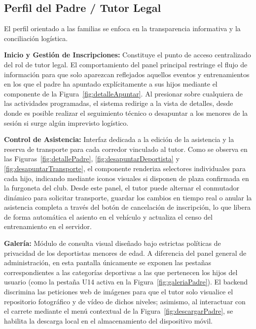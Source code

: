 \subsection{Perfil del Padre / Tutor Legal}
\label{subsec:rol_padre}
El perfil orientado a las familias se enfoca en la transparencia informativa y la conciliación logística.

\noindent \textbf{Inicio y Gestión de Inscripciones:} Constituye el punto de acceso centralizado del rol de tutor legal. El comportamiento del panel principal restringe el flujo de información para que solo aparezcan reflejados aquellos eventos y entrenamientos en los que el padre ha apuntado explícitamente a sus hijos mediante el componente de la Figura~\ref{fig:detalleApuntar}. Al presionar sobre cualquiera de las actividades programadas, el sistema redirige a la vista de detalles, desde donde es posible realizar el seguimiento técnico o desapuntar a los menores de la sesión si surge algún imprevisto logístico. \par \smallskip

\noindent \textbf{Control de Asistencia:} Interfaz dedicada a la edición de la asistencia y la reserva de transporte para cada corredor vinculado al tutor. Como se observa en las Figuras~\ref{fig:detallePadre}, \ref{fig:desapuntarDeportista} y \ref{fig:desapuntarTransporte}, el componente renderiza selectores individuales para cada hijo, indicando mediante iconos visuales si disponen de plaza confirmada en la furgoneta del club. Desde este panel, el tutor puede alternar el conmutador dinámico para solicitar transporte, guardar los cambios en tiempo real o anular la asistencia completa a través del botón de cancelación de inscripción, lo que libera de forma automática el asiento en el vehículo y actualiza el censo del entrenamiento en el servidor. \par \smallskip

\noindent \textbf{Galería:} Módulo de consulta visual diseñado bajo estrictas políticas de privacidad de los deportistas menores de edad. A diferencia del panel general de administración, en esta pantalla únicamente se exponen las pestañas correspondientes a las categorías deportivas a las que pertenecen los hijos del usuario (como la pestaña U14 activa en la Figura~\ref{fig:galeriaPadre}). El backend discrimina las peticiones web de imágenes para que el tutor solo visualice el repositorio fotográfico y de vídeo de dichos niveles; asimismo, al interactuar con el carrete mediante el menú contextual de la Figura~\ref{fig:descargarPadre}, se habilita la descarga local en el almacenamiento del dispositivo móvil.

